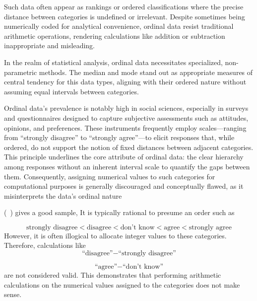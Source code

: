 \documentclass{article}
\begin{document}
Such data often appear as rankings or ordered classifications where the precise distance between categories is undefined or irrelevant. 
Despite sometimes being numerically coded for analytical convenience, ordinal data resist traditional arithmetic operations, rendering calculations like addition or subtraction inappropriate and misleading.

In the realm of statistical analysis, ordinal data necessitates specialized, non-parametric methods. 
The median and mode stand out as appropriate measures of central tendency for this data types, 
aligning with their ordered nature without assuming equal intervals between categories.

Ordinal data's prevalence is notably high in social sciences, especially in surveys and questionnaires designed to capture subjective assessments such as attitudes, opinions, and preferences. These instruments frequently employ scales—ranging from ``strongly disagree'' to ``strongly agree''—to elicit responses that, while ordered, do not support the notion of fixed distances between adjacent categories. This principle underlines the core attribute of ordinal data: the clear hierarchy among responses without an inherent interval scale to quantify the gaps between them. Consequently, assigning numerical values to such categories for computational purposes is generally discouraged and conceptually flawed, as it misinterprets the data's ordinal nature 

(~\textcite{Johnson1999}) gives a good sample,
 It is typically rational to presume an order such as

 \[
 \text{strongly disagree} < \text{disagree} < \text{don’t know} < \text{agree} < \text{strongly agree}
\]
 However, it is often illogical to allocate integer values to these categories. Therefore, calculations like
\[
\text{``disagree''} - \text{``strongly disagree''}
\]

\[
\text{``agree''} - \text{``don't know''}
\]
are not considered valid. 
This demonstrates that performing arithmetic calculations on the numerical values assigned to the categories does not make sense.
\end{document}
